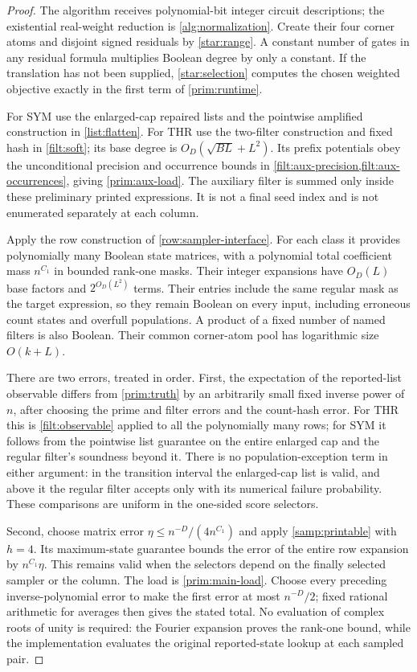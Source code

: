\documentclass[11pt,letterpaper]{article}
\theoremstyle{definition}
\theoremstyle{remark}
\begin{document}
\begin{proof}
The algorithm receives polynomial-bit integer circuit descriptions;
the existential real-weight reduction is \cref{alg:normalization}.
Create their four corner atoms and disjoint signed residuals by
\cref{star:range}. A constant number of gates in any residual formula
multiplies Boolean degree by only a constant. If the translation has
not been supplied, \cref{star:selection} computes the chosen weighted
objective exactly in the first term of \cref{prim:runtime}.

For SYM use the enlarged-cap repaired lists and the pointwise amplified
construction in \cref{list:flatten}. For THR use the two-filter
construction and fixed hash in \cref{filt:soft}; its base degree is
$O_D(\sqrt{BL}+L^2)$. Its prefix potentials obey the unconditional
precision and occurrence bounds in
\cref{filt:aux-precision,filt:aux-occurrences}, giving
\cref{prim:aux-load}. The auxiliary filter is summed only inside
these preliminary printed expressions. It is not a final seed index
and is not enumerated separately at each column.

Apply the row construction of \cref{row:sampler-interface}. For each class it
provides polynomially many Boolean state matrices, with a polynomial
total coefficient mass $n^{C_1}$ in bounded rank-one masks. Their
integer expansions have $O_D(L)$ base factors and
$2^{O_D(L^2)}$ terms. Their entries include the same regular mask as
the target expression, so they remain Boolean on every input,
including erroneous count states and overfull populations. A product
of a fixed number of named filters is also Boolean. Their common
corner-atom pool has logarithmic size $O(k+L)$.

There are two errors, treated in order. First, the expectation of the
reported-list observable differs from \cref{prim:truth} by an
arbitrarily small fixed inverse power of $n$, after choosing the
prime and filter errors and the count-hash error. For THR this is
\cref{filt:observable} applied to all the polynomially many rows;
for SYM it follows from the pointwise list guarantee on the entire
enlarged cap and the regular filter's soundness beyond it. There is
no population-exception term in either argument: in the transition
interval the enlarged-cap list is valid, and above it the regular
filter accepts only with its numerical failure probability. These
comparisons are uniform in the one-sided score selectors.

Second, choose matrix error $\eta\le n^{-D}/(4n^{C_1})$ and apply
\cref{samp:printable} with $h=4$. Its maximum-state guarantee bounds
the error of the entire row expansion by $n^{C_1}\eta$. This remains
valid when the selectors depend on the finally selected sampler or
the column. The load is \cref{prim:main-load}. Choose every preceding
inverse-polynomial error to make the first error at most $n^{-D}/2$;
fixed rational arithmetic for averages then gives the stated total.
No evaluation of complex roots of unity is required: the Fourier
expansion proves the rank-one bound, while the implementation evaluates
the original reported-state lookup at each sampled pair.


\end{proof}
\end{document}

